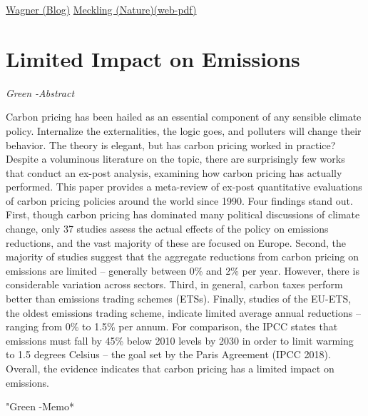 \documentclass[
]{book}
\begin{document}
\href{https://gwagner.com/policy-sequencing}{Wagner (Blog)}
\href{http://rdcu.be/yqPt}{Meckling (Nature)(web-pdf)}

\hypertarget{limited-impact-on-emissions}{%
\section{Limited Impact on Emissions}\label{limited-impact-on-emissions}}

\emph{Green -Abstract}

Carbon pricing has been hailed as an essential component of any sensible climate policy. Internalize the externalities, the logic goes, and polluters will change their behavior. The theory is elegant, but has carbon pricing worked in practice? Despite a voluminous literature on the topic, there are surprisingly few works that conduct an ex-post analysis, examining how carbon pricing has actually performed. This paper provides a meta-review of ex-post quantitative evaluations of carbon pricing policies around the world since 1990. Four findings stand out. First, though carbon pricing has dominated many political discussions of climate change, only 37 studies assess the actual effects of the policy on emissions reductions, and the vast majority of these are focused on Europe. Second, the majority of studies suggest that the aggregate reductions from carbon pricing on emissions are limited -- generally between 0\% and 2\% per year. However, there is considerable variation across sectors. Third, in general, carbon taxes perform better than emissions trading schemes (ETSs). Finally, studies of the EU-ETS, the oldest emissions trading scheme, indicate limited average annual reductions -- ranging from 0\% to 1.5\% per annum. For comparison, the IPCC states that emissions must fall by 45\% below 2010 levels by 2030 in order to limit warming to 1.5 degrees Celsius -- the goal set by the Paris Agreement (IPCC 2018). Overall, the evidence indicates that carbon pricing has a limited impact on emissions.

"Green -Memo*
\end{document}
